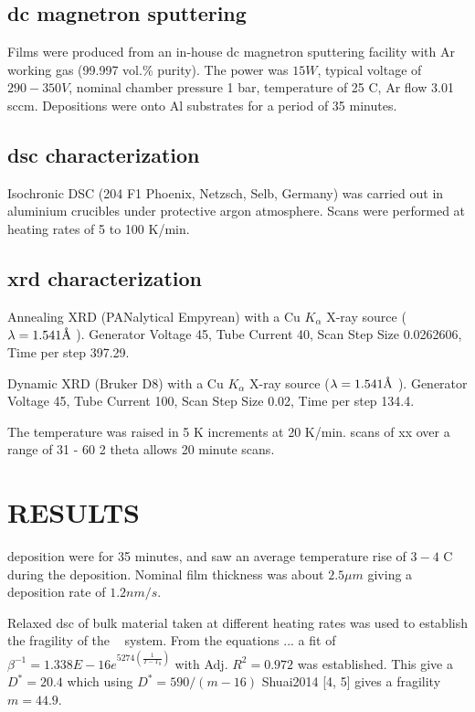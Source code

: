 \documentclass[a4paper,12pt,oneside]{article}%
\begin{document}
\subsection{\acrshort{dc} magnetron sputtering}
Films were produced from an in-house \acrshort{dc} magnetron sputtering facility with Ar working gas (99.997 vol.\% purity). The power was $15W$, typical voltage of $290-350V$, nominal chamber pressure 1 bar, temperature of 25 \degree C, Ar flow 3.01 \gls{sccm}. Depositions were onto Al substrates for a period of 35 minutes. 

\subsection{\acrshort{dsc} characterization}
Isochronic DSC (204 F1 Phoenix, Netzsch, Selb, Germany) was carried out in aluminium crucibles under protective argon atmosphere. Scans were performed at heating rates of 5 to 100 K/min.

\subsection{\acrshort{xrd} characterization}
Annealing XRD (PANalytical Empyrean) with a Cu $K_{\alpha}$ X-ray source ($\lambda = 1.541 \mbox{\normalfont\AA}$ ). Generator Voltage 45, Tube Current 40, Scan Step Size 0.0262606, Time per step 397.29. 

Dynamic XRD (Bruker D8) with a Cu $K_{\alpha}$ X-ray source ($\lambda = 1.541 \mbox{\normalfont\AA}$ ). Generator Voltage 45, Tube Current 100, Scan Step Size 0.02, Time per step 134.4. 

The temperature was raised in 5 K increments at 20 K/min. scans of xx over a range of 31 - 60 2 theta allows 20 minute scans. 


\section{RESULTS}

deposition were for 35 minutes, and saw an average temperature rise of $3 - 4$ \degree C during the deposition. Nominal film thickness was about $2.5 \mu m$ giving a deposition rate of $1.2 nm/s$.  

Relaxed \gls{dsc} of bulk material taken at different heating rates was used to establish the fragility of the \MgZnCa~ system. From the equations ... a fit of
$\beta^{-1} = 1.338E - 16e^{5274 (\frac{1}{T-T_{0}})}$ with Adj. $R^{2}=0.972$ was established. This give a $D^{*}=20.4$ which using $D^{*}=590/(m-16)$ Shuai2014 [4, 5] gives a fragility $m=44.9$.
\end{document}
